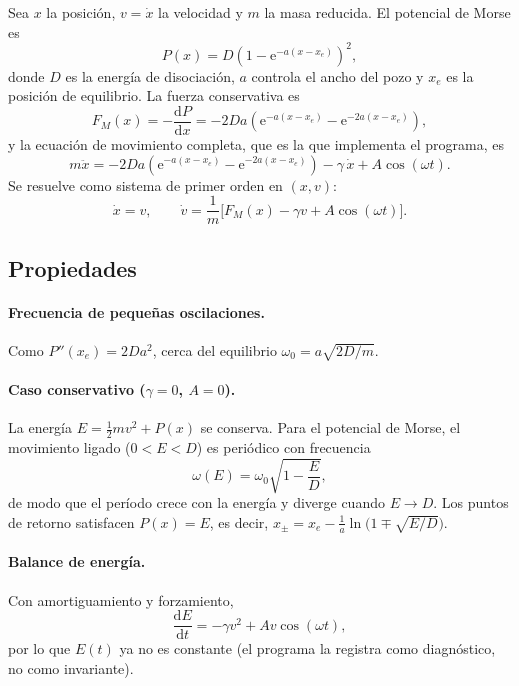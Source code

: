 \documentclass[12pt,a4paper]{article}
\newcommand{\dd}{\mathrm{d}}
\newcommand{\ee}{\mathrm{e}}
\begin{document}
Sea $x$ la posición, $v=\dot x$ la velocidad y $m$ la masa reducida. El potencial de Morse es
\begin{equation}
    P(x) = D\left(1-\ee^{-a(x-x_e)}\right)^{2},
    \label{eq:morse}
\end{equation}
donde $D$ es la energía de disociación, $a$ controla el ancho del pozo y $x_e$ es la posición de equilibrio. La fuerza conservativa es
\begin{equation}
    F_M(x) = -\frac{\dd P}{\dd x} = -2Da\left(\ee^{-a(x-x_e)}-\ee^{-2a(x-x_e)}\right),
\end{equation}
y la ecuación de movimiento completa, que es la que implementa el programa, es
\begin{equation}
    m\ddot x = -2Da\left(\ee^{-a(x-x_e)}-\ee^{-2a(x-x_e)}\right) - \gamma\,\dot x + A\cos(\omega t).
    \label{eq:mov}
\end{equation}
Se resuelve como sistema de primer orden en $(x,v)$:
\begin{equation}
    \dot x = v, \qquad \dot v = \frac{1}{m}\Big[F_M(x) - \gamma v + A\cos(\omega t)\Big].
\end{equation}

\subsection{Propiedades }

\paragraph{Frecuencia de pequeñas oscilaciones.} Como $P''(x_e)=2Da^{2}$, cerca del equilibrio $\omega_0 = a\sqrt{2D/m}$.

\paragraph{Caso conservativo ($\gamma=0$, $A=0$).} La energía $E=\tfrac12 mv^{2}+P(x)$ se conserva. Para el potencial de Morse, el movimiento ligado ($0<E<D$) es periódico con frecuencia
\begin{equation}
    \omega(E) = \omega_0\sqrt{1-\frac{E}{D}},
    \label{eq:omegaE}
\end{equation}
de modo que el período crece con la energía y diverge cuando $E\to D$. Los puntos de retorno satisfacen $P(x)=E$, es decir, $x_\pm = x_e - \tfrac1a\ln\!\big(1\mp\sqrt{E/D}\big)$.

\paragraph{Balance de energía.} Con amortiguamiento y forzamiento,
\begin{equation}
    \frac{\dd E}{\dd t} = -\gamma v^{2} + A v\cos(\omega t),
\end{equation}
por lo que $E(t)$ ya no es constante (el programa la registra como diagnóstico, no como invariante).
\end{document}
